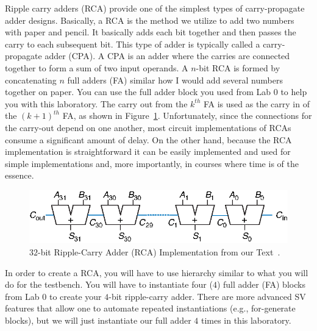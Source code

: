 \documentclass{article}
\begin{document}
Ripple carry adders (RCA) provide one of the simplest types of
carry-propagate adder designs.  Basically, a RCA is the method we
utilize to add two numbers
with paper and pencil.  It basically adds each bit together and then
passes the carry to each subsequent bit.  This type  of adder
is typically called a carry-propagate adder (CPA).
A CPA is an adder
where the carries are connected together to form a sum of two input
operands.
A $n$-bit RCA is formed by concatenating $n$ full adders (FA) similar
how I would add several numbers together on paper.  You
can use the full adder block you used from Lab 0 to help you with this
laboratory.  
The carry out from the $k^{th}$ FA is used as the carry in of 
the $(k + 1)^{th}$ FA, as shown in Figure~\ref{rca.fig}.  
Unfortunately, since 
the connections for the carry-out depend on one another, 
most circuit implementations of RCAs
consume a significant amount of delay.  On the other hand, 
because the RCA implementation is straightforward
it can be easily implemented and
used for simple implementations and, more importantly, in courses
where time is of the essence.
\begin{figure} [tb]
\begin{center}
\includegraphics[scale=1.75]{f05-05-9780128000564.eps}
\end{center}
\caption{$32$-bit Ripple-Carry Adder (RCA) Implementation from our Text~\cite{ddca-riscv}.}
\label{rca.fig}
\end{figure}

In order to create a RCA, you will have to use hierarchy similar to
what you will do for the testbench.  You will have to instantiate four
($4$) full adder (FA) blocks from Lab 0 to create your $4$-bit
ripple-carry adder.  There are more advanced SV features that
allow one to automate repeated instantiations (e.g., for-generate
blocks), but we will just instantiate our full adder $4$ times in this
laboratory.
\end{document}

